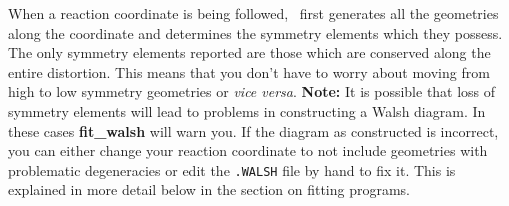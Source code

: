 When a reaction coordinate is being followed, \calcprog\ first
generates all the geometries along the coordinate and determines the
symmetry elements which they possess.  The only symmetry elements
reported are those which are conserved along the entire distortion.
This means that you don't have to worry about moving from high to low
symmetry geometries or {\it vice versa}.  {\bf Note:} It is possible
that loss of symmetry elements will lead to problems in constructing a
Walsh diagram.  In these cases {\bf {\sf fit\_walsh}} will warn you.
If the diagram as constructed is incorrect, you can either change your
reaction coordinate to not include geometries with problematic
degeneracies or edit the {\tt .WALSH} file by hand to fix it.  This is
explained in more detail below in the section on fitting programs.

